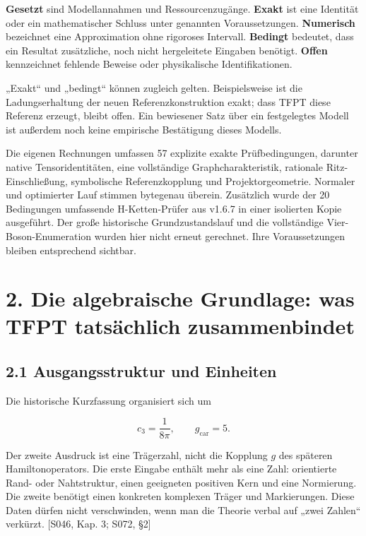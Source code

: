 \textbf{Gesetzt} sind Modellannahmen und Ressourcenzugänge.
\textbf{Exakt} ist eine Identität oder ein mathematischer Schluss unter
genannten Voraussetzungen. \textbf{Numerisch} bezeichnet eine
Approximation ohne rigoroses Intervall. \textbf{Bedingt} bedeutet, dass
ein Resultat zusätzliche, noch nicht hergeleitete Eingaben benötigt.
\textbf{Offen} kennzeichnet fehlende Beweise oder physikalische
Identifikationen.

„Exakt`` und „bedingt`` können zugleich gelten. Beispielsweise ist die
Ladungserhaltung der neuen Referenzkonstruktion exakt; dass TFPT diese
Referenz erzeugt, bleibt offen. Ein bewiesener Satz über ein
festgelegtes Modell ist außerdem noch keine empirische Bestätigung
dieses Modells.

Die eigenen Rechnungen umfassen 57 explizite exakte Prüfbedingungen,
darunter native Tensoridentitäten, eine vollständige
Graphcharakteristik, rationale Ritz-Einschließung, symbolische
Referenzkopplung und Projektorgeometrie. Normaler und optimierter Lauf
stimmen bytegenau überein. Zusätzlich wurde der 20 Bedingungen
umfassende H-Ketten-Prüfer aus v1.6.7 in einer isolierten Kopie
ausgeführt. Der große historische Grundzustandslauf und die vollständige
Vier-Boson-Enumeration wurden hier nicht erneut gerechnet. Ihre
Voraussetzungen bleiben entsprechend sichtbar.

\section{2. Die algebraische Grundlage: was TFPT tatsächlich
zusammenbindet}\label{die-algebraische-grundlage-was-tfpt-tatsuxe4chlich-zusammenbindet}

\subsection{2.1 Ausgangsstruktur und
Einheiten}\label{ausgangsstruktur-und-einheiten}

Die historische Kurzfassung organisiert sich um

\[c_3=\frac1{8\pi},\qquad g_{\mathrm{car}}=5.\]

Der zweite Ausdruck ist eine Trägerzahl, nicht die Kopplung \(g\) des
späteren Hamiltonoperators. Die erste Eingabe enthält mehr als eine
Zahl: orientierte Rand- oder Nahtstruktur, einen geeigneten positiven
Kern und eine Normierung. Die zweite benötigt einen konkreten komplexen
Träger und Markierungen. Diese Daten dürfen nicht verschwinden, wenn man
die Theorie verbal auf „zwei Zahlen`` verkürzt. {[}S046, Kap. 3; S072,
§2{]}

